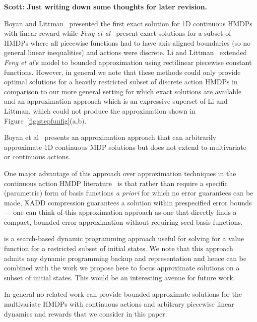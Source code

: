 {\bf Scott: Just writing down some thoughts for later revision.}

Boyan and Littman~\cite{boyan01} presented the first exact solution
for 1D continuous HMDPs with linear reward while {\it Feng et
  al}~\cite{feng04} present exact solutions for a subset of HMDPs
where all piecewise functions had to have axis-aligned boundaries (so
no general linear inequalities) and actions were discrete.  Li and
Littman~\cite{li05} extended {\it Feng et al}'s model to bounded
approximation using rectilinear piecewise constant functions.
However, in general we note that these methods could only provide
optimal solutions for a heavily restricted subset of discrete action
HMDPs in comparison to our more general setting for which exact
solutions are available and an approximation approach which is an
expressive superset of Li and Littman, which could not produce the
approximation shown in Figure~\ref{fig:stepfunfig}(a,b).

Boyan et al~\cite{phase07} presents an approximation approach that can
arbitrarily approximate 1D continuous MDP solutions but does not
extend to multivariate or continuous actions.

One major advantage of this approach over approximation techniques in
the continuous action HMDP literature~\cite{kveton06,kveton06aaai} is
that rather than require a specific (parametric) form of basis
functions \emph{a priori} for which no error guarantees can be made,
XADD compression guarantees a solution within prespecified error
bounds --- one can think of this approximation approach as one that
directly finds a compact, bounded error approximation without
requiring seed basis functions.

\cite{hao09} is a search-based dynamic programming approach useful for
solving for a value function for a restricted subset of initial
states.  We note that this approach admits any dynamic programming
backup and representation and hence can be combined with the work we
propose here to focus approximate solutions on a subset of initial
states.  This would be an interesting avenue for future work.

In general no related work can provide bounded approximate solutions
for the multivariate HMDPs with continuous actions and arbitrary
piecewise linear dynamics and rewards that we consider in this paper.

